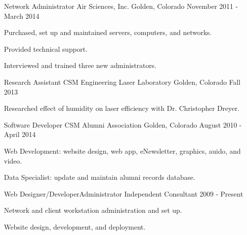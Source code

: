 

\begin{cventries}

  \cventry
    {Network Administrator} %
    {Air Sciences, Inc.} %
    {Golden, Colorado} %
    {November 2011 - March 2014} %
    {
      \begin{cvitems} %
        \item {Purchased, set up and maintained servers, computers, and networks.}
        \item {Provided technical support.}
        \item {Interviewed and trained three new administrators.}
      \end{cvitems}
    }

  \cventry
    {Research Assistant} %
    {CSM Engineering Laser Laboratory} %
    {Golden, Colorado} %
    {Fall 2013} %
    {
      \begin{cvitems} %
        \item {Researched effect of humidity on laser efficiency with Dr. Christopher Dreyer.}
      \end{cvitems}
    }

  \cventry
    {Software Developer} %
    {CSM Alumni Association} %
    {Golden, Colorado} %
    {August 2010 - April 2014} %
    {
      \begin{cvitems} %
        \item {Web Development: website design, web app, eNewsletter, graphics, auido, and video.}
        \item {Data Specialist: update and maintain alumni records database.}
      \end{cvitems}
    }

  \cventry
    {Web Designer/Developer{\enskip\cdotp\enskip}Administrator} %
    {Independent Consultant} %
    {} %
    {2009 - Present} %
    {
      \begin{cvitems} %
        \item {Network and client workstation administration and set up.}
        \item {Website design, development, and deployment.}
      \end{cvitems}
    }

\end{cventries}
